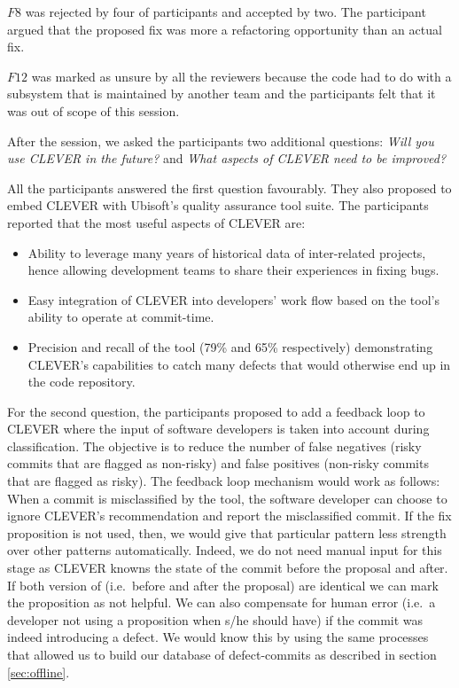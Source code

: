 \documentclass[sigconf]{acmart}
\providecommand{\tightlist}{%
  \setlength{\itemsep}{0pt}\setlength{\parskip}{0pt}}
\begin{document}
\(F8\) was rejected by four of participants and accepted by two. The
participant argued that the proposed fix was more a refactoring
opportunity than an actual fix.

\(F12\) was marked as unsure by all the reviewers because the code had
to do with a subsystem that is maintained by another team and the
participants felt that it was out of scope of this session.

After the session, we asked the participants two additional questions:
\emph{Will you use CLEVER in the future?} and \emph{What aspects of
CLEVER need to be improved?}

All the participants answered the first question favourably. They also
proposed to embed CLEVER with Ubisoft's quality assurance tool suite.
The participants reported that the most useful aspects of CLEVER are:

\begin{itemize}
\tightlist
\item
  Ability to leverage many years of historical data of inter-related
  projects, hence allowing development teams to share their experiences
  in fixing bugs.
\item
  Easy integration of CLEVER into developers' work flow based on the
  tool's ability to operate at commit-time.\\
\item
  Precision and recall of the tool (79\% and 65\% respectively)
  demonstrating CLEVER's capabilities to catch many defects that would
  otherwise end up in the code repository.
\end{itemize}

For the second question, the participants proposed to add a feedback
loop to CLEVER where the input of software developers is taken into
account during classification. The objective is to reduce the number of
false negatives (risky commits that are flagged as non-risky) and false
positives (non-risky commits that are flagged as risky). The feedback
loop mechanism would work as follows: When a commit is misclassified by
the tool, the software developer can choose to ignore CLEVER's
recommendation and report the misclassified commit. If the fix
proposition is not used, then, we would give that particular pattern
less strength over other patterns automatically. Indeed, we do not need
manual input for this stage as CLEVER knowns the state of the commit
before the proposal and after. If both version of (i.e.~before and after
the proposal) are identical we can mark the proposition as not helpful.
We can also compensate for human error (i.e.~a developer not using a
proposition when s/he should have) if the commit was indeed introducing
a defect. We would know this by using the same processes that allowed us
to build our database of defect-commits as described in section
\ref{sec:offline}.
\end{document}
